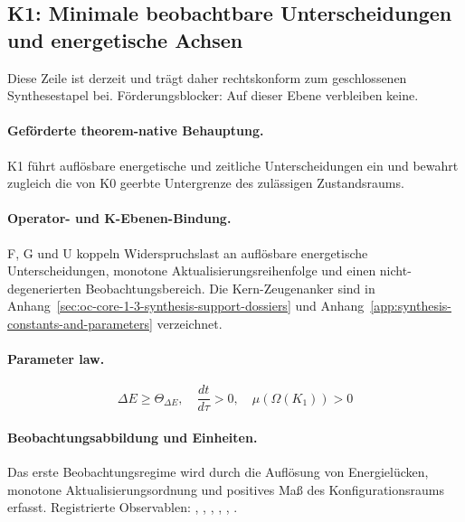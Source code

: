 \subsection{K1: Minimale beobachtbare Unterscheidungen und energetische Achsen}
\label{sec:oc-core-1-3-synthesis-k1}
Diese Zeile ist derzeit  und trägt daher rechtskonform zum geschlossenen Synthesestapel bei.
Förderungsblocker: Auf dieser Ebene verbleiben keine.

\paragraph{Geförderte theorem-native Behauptung.}
K1 führt auflösbare energetische und zeitliche Unterscheidungen ein und bewahrt zugleich die von K0 geerbte Untergrenze des zulässigen Zustandsraums.

\paragraph{Operator- und K-Ebenen-Bindung.}
F, G und U koppeln Widerspruchslast an auflösbare energetische Unterscheidungen, monotone Aktualisierungsreihenfolge und einen nicht-degenerierten Beobachtungsbereich.
Die Kern-Zeugenanker sind in Anhang~\ref{sec:oc-core-1-3-synthesis-support-dossiers} und Anhang~\ref{app:synthesis-constants-and-parameters} verzeichnet.

\paragraph{Parameter law.}
\[
\Delta E \geq \Theta_{\Delta E},\quad \frac{dt}{d\tau} > 0,\quad \mu(\Omega(K_1)) > 0
\]

\paragraph{Beobachtungsabbildung und Einheiten.}
Das erste Beobachtungsregime wird durch die Auflösung von Energielücken, monotone Aktualisierungsordnung und positives Maß des Konfigurationsraums erfasst.
Registrierte Observablen: , \allowbreak {}, \allowbreak {}, \allowbreak {}, \allowbreak {}, \allowbreak {}.

